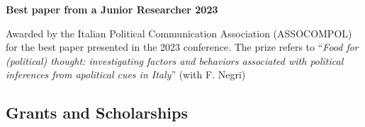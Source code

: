 \documentclass[10pt,]{article}
\providecommand{\tightlist}{%
  \setlength{\itemsep}{0pt}\setlength{\parskip}{0pt}}
\renewenvironment{itemize}{
  \begin{list}{}{
    \setlength{\leftmargin}{1.5em}
  }
}{
  \end{list}
}
\begin{document}
\begin{itemize}
\tightlist
\item
  \textbf{Best paper from a Junior Researcher 2023}

  \begin{itemize}
  \tightlist
  \item
    Awarded by the Italian Political Communication Association
    (ASSOCOMPOL) for the best paper presented in the 2023 conference.
    The prize refers to ``\emph{Food for (political) thought:
    investigating factors and behaviors associated with political
    inferences from apolitical cues in Italy}'' (with F. Negri)
  \end{itemize}
\end{itemize}

\subsection{Grants and Scholarships}\label{grants-and-scholarships}
\end{document}
